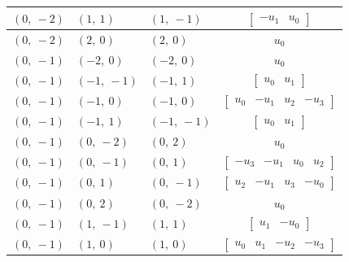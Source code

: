 \documentclass[11pt]{article}
\theoremstyle{definition}
\begin{document}
\begin{longtable}{|l|l|l|c|}
    \hline
    $\left( 0, \  -2\right)$ & $\left( 1, \  1\right)$ & $\left( 1, \  -1\right)$ & $\left[\begin{matrix}- u_{1} & u_{0}\end{matrix}\right]$ \\
    \hline
    $\left( 0, \  -2\right)$ & $\left( 2, \  0\right)$ & $\left( 2, \  0\right)$ & $u_{0}$ \\
    \hline
    $\left( 0, \  -1\right)$ & $\left( -2, \  0\right)$ & $\left( -2, \  0\right)$ & $u_{0}$ \\
    \hline
    $\left( 0, \  -1\right)$ & $\left( -1, \  -1\right)$ & $\left( -1, \  1\right)$ & $\left[\begin{matrix}u_{0} & u_{1}\end{matrix}\right]$ \\
    \hline
    $\left( 0, \  -1\right)$ & $\left( -1, \  0\right)$ & $\left( -1, \  0\right)$ & $\left[\begin{matrix}u_{0} & - u_{1} & u_{2} & - u_{3}\end{matrix}\right]$ \\
    \hline
    $\left( 0, \  -1\right)$ & $\left( -1, \  1\right)$ & $\left( -1, \  -1\right)$ & $\left[\begin{matrix}u_{0} & u_{1}\end{matrix}\right]$ \\
    \hline
    $\left( 0, \  -1\right)$ & $\left( 0, \  -2\right)$ & $\left( 0, \  2\right)$ & $u_{0}$ \\
    \hline
    $\left( 0, \  -1\right)$ & $\left( 0, \  -1\right)$ & $\left( 0, \  1\right)$ & $\left[\begin{matrix}- u_{3} & - u_{1} & u_{0} & u_{2}\end{matrix}\right]$ \\
    \hline
    $\left( 0, \  -1\right)$ & $\left( 0, \  1\right)$ & $\left( 0, \  -1\right)$ & $\left[\begin{matrix}u_{2} & - u_{1} & u_{3} & - u_{0}\end{matrix}\right]$ \\
    \hline
    $\left( 0, \  -1\right)$ & $\left( 0, \  2\right)$ & $\left( 0, \  -2\right)$ & $u_{0}$ \\
    \hline
    $\left( 0, \  -1\right)$ & $\left( 1, \  -1\right)$ & $\left( 1, \  1\right)$ & $\left[\begin{matrix}u_{1} & - u_{0}\end{matrix}\right]$ \\
    \hline
    $\left( 0, \  -1\right)$ & $\left( 1, \  0\right)$ & $\left( 1, \  0\right)$ & $\left[\begin{matrix}u_{0} & u_{1} & - u_{2} & - u_{3}\end{matrix}\right]$ \\

\end{longtable}
\end{document}
